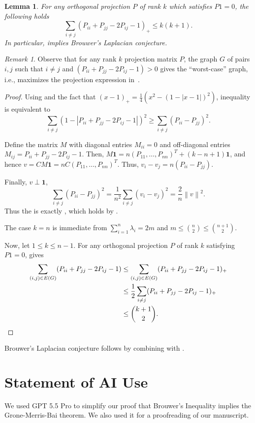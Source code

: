 \documentclass[10pt,reqno]{amsart}
\newtheorem{lemma}[theorem]{Lemma}
\theoremstyle{definition}
\theoremstyle{remark}
\newtheorem{remark}[theorem]{Remark}
\numberwithin{equation}{section}
\newcommand{\norm}[1]{\left\| #1 \right\|}
\begin{document}
\begin{lemma}\label{lem:strongmatrixineq}
For any orthogonal projection $P$ of rank $k$ which satisfies $P1=0$, the following holds
 \begin{equation}\label{eq:mainineq}
    \sum\limits_{i\ne j}(P_{ii}+P_{jj}-2P_{ij}-1)_+\le k(k+1).
 \end{equation}
In particular,  implies Brouwer's Laplacian conjecture.
\end{lemma}
\begin{remark}
Observe that for any rank $k$ projection matrix $P$, the graph $G$ of pairs $i,j$ such that $i \neq j$ and $(P_{ii}+P_{jj}-2P_{ij}-1)>0$ gives the ``worst-case'' graph, i.e., maximizes the projection expression in~. 
\end{remark}
\begin{proof}
Using  and the fact that $(x-1)_+=\frac{1}{4}\left (x^2-(1-|x-1|)^2\right )$, inequality  is equivalent to
\begin{equation}
\sum\limits_{i\ne j} \left ( 1-|P_{ii}+P_{jj}-2P_{ij}-1|\right )^2\ge \sum\limits_{i\ne j} (P_{ii}-P_{jj})^2. \label{eq:intermediate}
\end{equation}

Define the matrix $M$ with diagonal entries $M_{ii}=0$ and off-diagonal entries $M_{ij}=P_{ii}+P_{jj}-2P_{ij}-1$. Then,  $M\mathbf 1
=
n(P_{11},\ldots,P_{nn})^T+(k-n+1)\mathbf 1$, 
and hence $v=CM\mathbf 1=nC(P_{11},\ldots,P_{nn})^T$.
Thus,  $v_i-v_j=n(P_{ii}-P_{jj})$.

Finally, $v\perp \mathbf 1$,
\[
\sum_{i\ne j}(P_{ii}-P_{jj})^2
=
\frac1{n^2}\sum_{i\ne j}(v_i-v_j)^2
=
\frac2n\norm{v}^2.
\]
Thus the  is exactly , which holds by .

The case $k=n$ is immediate from $\sum_{i=1}^{n}\lambda_i=2m$ and $m\le \binom{n}{2}\le \binom{n+1}{2}$. 

Now, let $1\le k\le n-1$. For any orthogonal projection $P$ of rank $k$ satisfying $P1=0$,  gives
\begin{align*}
\sum\limits_{(i,j)\in E(G)}(P_{ii}+P_{jj}-2P_{ij}-1)
&\le \sum\limits_{(i,j)\in E(G)}(P_{ii}+P_{jj}-2P_{ij}-1)_+\\
&\le \dfrac{1}{2}\sum\limits_{i\ne j}(P_{ii}+P_{jj}-2P_{ij}-1)_+\\
&\le \dbinom{k+1}{2}.
\end{align*}


\end{proof}

Brouwer's Laplacian conjecture follows by combining  with .

\section*{Statement of AI Use}
We used GPT 5.5 Pro to simplify our proof that Brouwer's Inequality implies the Grone-Merris-Bai theorem. We also used it for a proofreading of our manuscript. 



\end{document}
